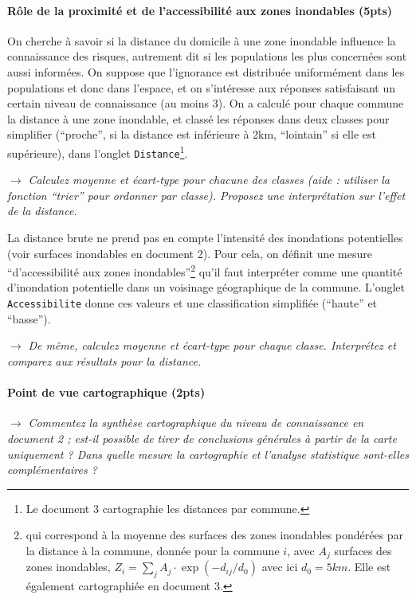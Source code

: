 \paragraph{Rôle de la proximité et de l'accessibilité aux zones inondables (5pts)}

On cherche à savoir si la distance du domicile à une zone inondable influence la connaissance des risques, autrement dit si les populations les plus concernées sont aussi informées. On suppose que l'ignorance est distribuée uniformément dans les populations et donc dans l'espace, et on s'intéresse aux réponses satisfaisant un certain niveau de connaissance (au moins 3). On a calculé pour chaque commune la distance à une zone inondable, et classé les réponses dans deux classes pour simplifier (``proche'', si la distance est inférieure à 2km, ``lointain'' si elle est supérieure), dans l'onglet \texttt{Distance}\footnote{Le document 3 cartographie les distances par commune.}.

\medskip

$\rightarrow$ \textit{Calculez moyenne et écart-type pour chacune des classes (aide : utiliser la fonction ``trier'' pour ordonner par classe). Proposez une interprétation sur l'effet de la distance.}


\medskip

La distance brute ne prend pas en compte l'intensité des inondations potentielles (voir surfaces inondables en document 2). Pour cela, on définit une mesure ``d'accessibilité aux zones inondables''\footnote{qui correspond à la moyenne des surfaces des zones inondables pondérées par la distance à la commune, donnée pour la commune $i$, avec $A_j$ surfaces des zones inondables, $Z_i = \sum_j A_j\cdot \exp\left(- d_{ij}/d_0 \right)$ avec ici $d_0=5km$. Elle est également cartographiée en document 3.} qu'il faut interpréter comme une quantité d'inondation potentielle dans un voisinage géographique de la commune. L'onglet \texttt{Accessibilite} donne ces valeurs et une classification simplifiée (``haute'' et ``basse'').

\medskip

$\rightarrow$ \textit{De même, calculez moyenne et écart-type pour chaque classe. Interprétez et comparez aux résultats pour la distance.}


\paragraph{Point de vue cartographique (2pts)}

$\rightarrow$ \textit{Commentez la synthèse cartographique du niveau de connaissance en document 2 ; est-il possible de tirer de conclusions générales à partir de la carte uniquement ? Dans quelle mesure la cartographie et l'analyse statistique sont-elles complémentaires ?}




